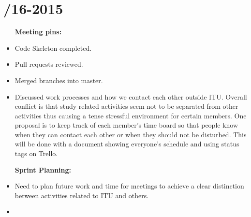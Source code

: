\section{/16-2015} %
\attend{\at}{\nat}{\at}{\at}


\begin{itemize}
	\item [\textbf{Meeting pins:}]
	\item Code Skeleton completed.
	\item Pull requests reviewed.
	\item Merged branches into master.
	\item Discussed work processes and how we contact each other outside ITU. Overall conflict is that study related activities seem not to be separated from other activities thus causing a tense stressful environment for certain members. One proposal is to keep track of each member's time board  so that people know when they can contact each other or when they should not be disturbed. This will be done with a document showing everyone's schedule and using status tags on Trello. 
\end{itemize}

\begin{itemize}
	\item [\textbf{Sprint Planning:}]
	\item Need to plan future work and time for meetings to achieve a clear distinction between activities related to ITU and others. 
	\item 
\end{itemize}